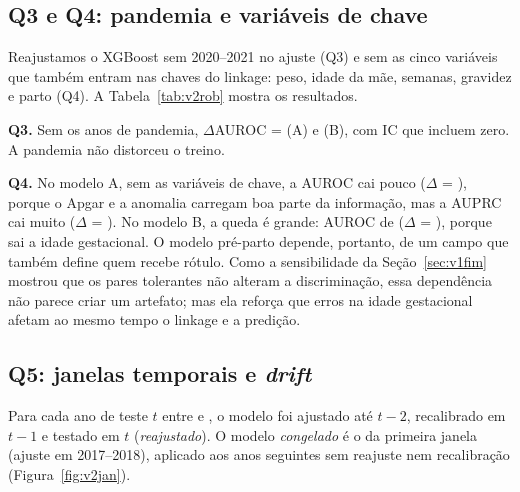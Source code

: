 \documentclass[12pt]{article}
\begin{document}
\begin{table}[!htbp]
\centering
\caption{Q2: AUROC dos óbitos com DN declarada depois do óbito $\times$ até o dia do óbito, na mesma faixa de idade (contra todos os sobreviventes).}
\label{tab:v2dec}
\small
\tabVDeclaracao
\end{table}

\subsection{Q3 e Q4: pandemia e variáveis de chave}

Reajustamos o XGBoost sem 2020--2021 no ajuste (Q3) e sem as cinco variáveis que também entram nas chaves do linkage: peso, idade da mãe, semanas, gravidez e parto (Q4). A Tabela~\ref{tab:v2rob} mostra os resultados.

\begin{table}[!htbp]
\centering
\caption{Q3 e Q4: XGBoost reajustado com os mesmos hiperparâmetros (teste de \anoTeste; $\Delta$ por bootstrap pareado).}
\label{tab:v2rob}
\small
\setlength{\tabcolsep}{4pt}
\tabVRobustez
\end{table}

\textbf{Q3.} Sem os anos de pandemia, $\Delta$AUROC = \vPandADauroc{} (A) e \vPandBDauroc{} (B), com IC que incluem zero. A pandemia não distorceu o treino.

\textbf{Q4.} No modelo A, sem as variáveis de chave, a AUROC cai pouco ($\Delta$ = \vChaveADauroc{}), porque o Apgar e a anomalia carregam boa parte da informação, mas a AUPRC cai muito ($\Delta$ = \vChaveADauprc{}). No modelo B, a queda é grande: AUROC de \vChaveBAuroc{} ($\Delta$ = \vChaveBDauroc{}), porque sai a idade gestacional. O modelo pré-parto depende, portanto, de um campo que também define quem recebe rótulo. Como a sensibilidade da Seção~\ref{sec:v1fim} mostrou que os pares tolerantes não alteram a discriminação, essa dependência não parece criar um artefato; mas ela reforça que erros na idade gestacional afetam ao mesmo tempo o linkage e a predição.

\subsection{Q5: janelas temporais e \emph{drift}}

Para cada ano de teste $t$ entre \vJanAnoIni{} e \vJanAnoFim{}, o modelo foi ajustado até $t-2$, recalibrado em $t-1$ e testado em $t$ (\emph{reajustado}). O modelo \emph{congelado} é o da primeira janela (ajuste em 2017--2018), aplicado aos anos seguintes sem reajuste nem recalibração (Figura~\ref{fig:v2jan}).
\end{document}
